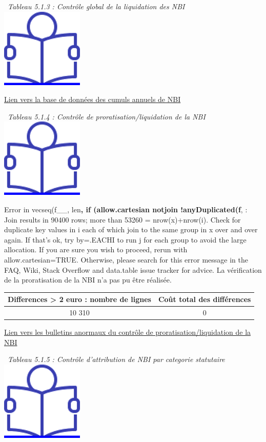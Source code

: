 ~\emph{Tableau 5.1.3 : Contrôle global de la liquidation des NBI} ~
\href{../Docs/Notices/fiche_NBI_glob.odt}{\includegraphics{icones/Notice.png}}

\href{../Bases/Fiabilite/cumuls.nbi.csv}{Lien vers la base de données des
cumuls annuels de NBI}

~\emph{Tableau 5.1.4 : Contrôle de proratisation/liquidation de la NBI}
~
\href{../Docs/Notices/fiche_NBI_prorat.odt}{\includegraphics{icones/Notice.png}}

Error in vecseq(f\_\_, len\textbf{, if (allow.cartesian
\textbar{}\textbar{} notjoin \textbar{}\textbar{} !anyDuplicated(f}, :
Join results in 90400 rows; more than 53260 = nrow(x)+nrow(i). Check for
duplicate key values in i each of which join to the same group in x over
and over again. If that's ok, try by=.EACHI to run j for each group to
avoid the large allocation. If you are sure you wish to proceed, rerun
with allow.cartesian=TRUE. Otherwise, please search for this error
message in the FAQ, Wiki, Stack Overflow and data.table issue tracker
for advice. La vérification de la proratisation de la NBI n'a pas pu
être réalisée.

\begin{longtable}[]{@{}cc@{}}
\toprule
Differences \textgreater{} 2 euro : nombre de lignes & Coût total des
différences\tabularnewline
\midrule
\endhead
10 310 & 0\tabularnewline
\bottomrule
\end{longtable}

\href{../Bases/Fiabilite/lignes.nbi.anormales.mensuel.csv}{Lien vers les
bulletins anormaux du contrôle de proratisation/liquidation de la NBI}

~\emph{Tableau 5.1.5 : Contrôle d'attribution de NBI par categorie
statutaire} ~
\href{../Docs/Notices/fiche_plafonds_NBI.odt}{\includegraphics{icones/Notice.png}}

